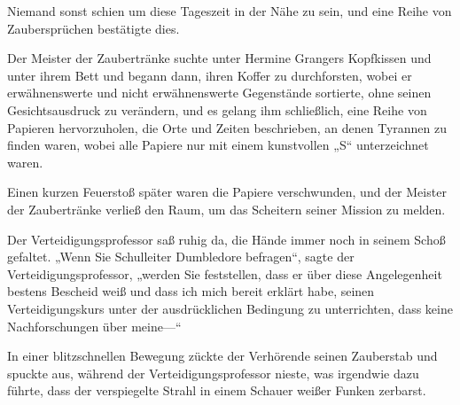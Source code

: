 Niemand sonst schien um diese Tageszeit in der Nähe zu sein, und eine Reihe von Zaubersprüchen bestätigte dies.

Der Meister der Zaubertränke suchte unter Hermine Grangers Kopfkissen und unter ihrem Bett und begann dann, ihren Koffer zu durchforsten, wobei er erwähnenswerte und nicht erwähnenswerte Gegenstände sortierte, ohne seinen Gesichtsausdruck zu verändern, und es gelang ihm schließlich, eine Reihe von Papieren hervorzuholen, die Orte und Zeiten beschrieben, an denen Tyrannen zu finden waren, wobei alle Papiere nur mit einem kunstvollen
„S“ unterzeichnet waren.

Einen kurzen Feuerstoß später waren die Papiere verschwunden, und der Meister der Zaubertränke verließ den Raum, um das Scheitern seiner Mission zu melden.

\later

Der Verteidigungsprofessor saß ruhig da, die Hände immer noch in seinem Schoß gefaltet.
„Wenn Sie Schulleiter Dumbledore befragen“, sagte der Verteidigungsprofessor, „werden Sie feststellen, dass er über diese Angelegenheit bestens Bescheid weiß und dass ich mich bereit erklärt habe, seinen Verteidigungskurs unter der ausdrücklichen Bedingung zu unterrichten, dass keine Nachforschungen über meine—“

In einer blitzschnellen Bewegung zückte der Verhörende seinen Zauberstab und spuckte  aus, während der Verteidigungsprofessor nieste, was irgendwie dazu führte, dass der verspiegelte Strahl in einem Schauer weißer Funken zerbarst.

